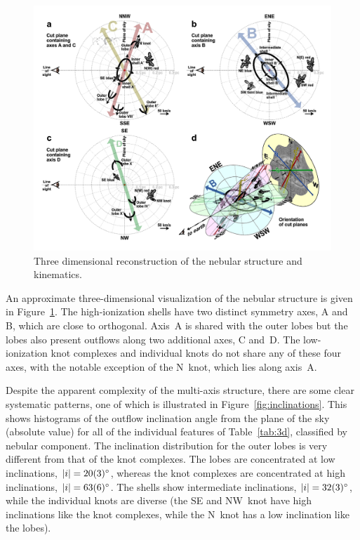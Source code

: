 \documentclass[useAMS, usenatbib]{mnras}
\begin{document}
\begin{figure}
  \includegraphics[width=\linewidth]
  {figs/cut-axis-4panel}
  \caption{Three dimensional reconstruction of the nebular structure and kinematics. }
  \label{fig:cut-axis-3d}
\end{figure}

An approximate three-dimensional visualization of the nebular structure is given in Figure~\ref{fig:cut-axis-3d}.
The high-ionization shells have two distinct symmetry axes, A and B, which are close to orthogonal.
Axis~A is shared with the outer lobes but the lobes also present outflows along two additional axes, C and~D.
The low-ionization knot complexes and individual knots do not share any of these four axes,
with the notable exception of the N~knot, which lies along axis~A.

Despite the apparent complexity of the multi-axis structure, there are some clear systematic patterns,
one of which is illustrated in Figure~\ref{fig:inclinations}.
This shows histograms of the outflow inclination angle from the plane of the sky (absolute value)
for all of the individual features of Table~\ref{tab:3d}, classified by nebular component.
The inclination distribution for the outer lobes is very different from that of the knot complexes.
The lobes are concentrated at low inclinations, \(|i| = \ang{20 \pm 3}\),
whereas the knot complexes are concentrated at high inclinations, \(|i| = \ang{63 \pm 6}\).
The shells show intermediate inclinations, \(|i| = \ang{32 \pm 3}\),
while the individual knots are diverse
(the SE and NW~knot have high inclinations like the knot complexes,
while the N~knot has a low inclination like the lobes). 
\end{document}
